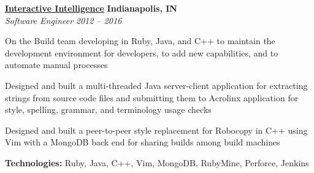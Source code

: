 %
    \headerrow
        {\textbf{\href{https://www.genesys.com/inin}{Interactive Intelligence}}}
        {\textbf{Indianapolis, IN}}
    \\
    \headerrow
        {\emph{Software Engineer}}
        {\emph{2012 -- 2016}}
    \begin{itemize*}
        \item On the Build team developing in Ruby, Java, and C++ to maintain the development environment for developers,
            to add new capabilities, and to automate manual processes
         \item Designed and built a multi-threaded Java server-client application for extracting strings from
                source code files and submitting them to Acrolinx application for style, spelling, grammar, and terminology
                usage checks
        \item Designed and built a peer-to-peer style replacement for Robocopy in C++ using Vim with a MongoDB back end
                for sharing builds among build machines
    \end{itemize*}

    \hspace{1.0em}
    \textbf{Technologies:} Ruby, Java, C++, Vim, MongoDB, RubyMine, Perforce, Jenkins

